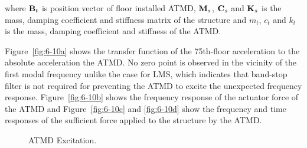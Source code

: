 where $\mathbf{B}_{t}$ is position vector of floor installed ATMD, $\mathbf{M}_{s}$, $\mathbf{C}_{s}$ and $\mathbf{K}_{s}$ is the mass, damping coefficient and stiffness matrix of the structure and $m_{t}$, $c_{t}$ and $k_{t}$ is the mass, damping coefficient and stiffness of the ATMD. 

Figure~\ref{fig:6-10a} shows the transfer function of the 75th-floor acceleration to the absolute acceleration the ATMD. No zero point is observed in the vicinity of the first modal frequency unlike the case for LMS, which indicates that band-stop filter is not required for preventing the ATMD to excite the unexpected frequency response. Figure~\ref{fig:6-10b} shows the frequency response of the actuator force of the ATMD and Figure~\ref{fig:6-10c} and \ref{fig:6-10d} show the frequency and time responses of the sufficient force applied to the structure by the ATMD.

\begin{figure}[!ht]
\centering
{}
\caption{ATMD Excitation.}
\label{fig:6-10}
\end{figure}

